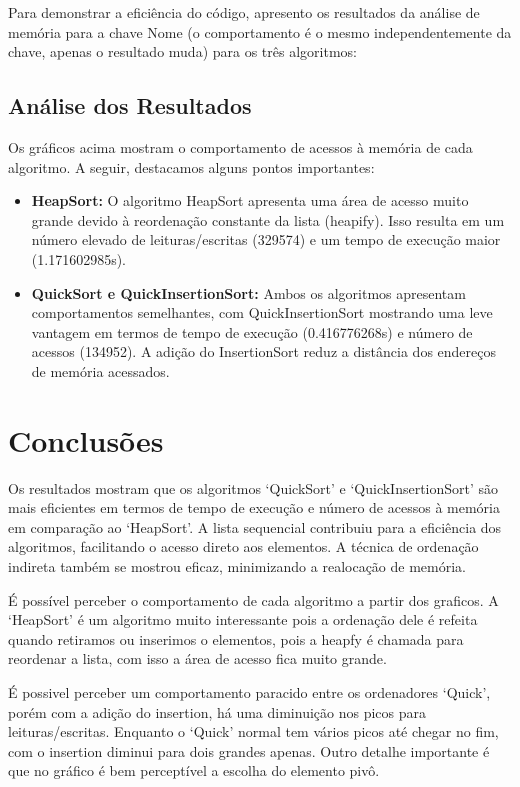 \documentclass[a4paper,12pt]{article}
\begin{document}
Para demonstrar a eficiência do código, apresento os resultados da análise de memória para a chave Nome (o comportamento é o mesmo independentemente da chave, apenas o resultado muda) para os três algoritmos:

\subsection{Análise dos Resultados}
\hspace*{1cm}

Os gráficos acima mostram o comportamento de acessos à memória de cada algoritmo. A seguir, destacamos alguns pontos importantes:

\begin{itemize}
    \item \textbf{HeapSort:} O algoritmo HeapSort apresenta uma área de acesso muito grande devido à reordenação constante da lista (heapify). Isso resulta em um número elevado de leituras/escritas (329574) e um tempo de execução maior (1.171602985s).
    \item \textbf{QuickSort e QuickInsertionSort:} Ambos os algoritmos apresentam comportamentos semelhantes, com QuickInsertionSort mostrando uma leve vantagem em termos de tempo de execução (0.416776268s) e número de acessos (134952). A adição do InsertionSort reduz a distância dos endereços de memória acessados.
\end{itemize}

\section{Conclusões}
\hspace*{1cm}

Os resultados mostram que os algoritmos `QuickSort' e `QuickInsertionSort' são mais eficientes em termos de tempo de execução e número de acessos à memória em comparação ao `HeapSort'.
A lista sequencial contribuiu para a eficiência dos algoritmos, facilitando o acesso direto aos elementos. A técnica de ordenação indireta também se mostrou eficaz, minimizando a realocação de memória. 

É possível perceber o comportamento de cada algoritmo a partir dos graficos.
A `HeapSort' é um algoritmo muito interessante pois a ordenação dele é refeita quando retiramos ou inserimos o elementos,
pois a heapfy é chamada para reordenar a lista, com isso a área de acesso fica muito grande.

É possivel perceber um comportamento paracido entre os ordenadores `Quick', porém com a adição do insertion, há uma diminuição nos picos para leituras/escritas.
Enquanto o `Quick' normal tem vários picos até chegar no fim, com o insertion diminui para dois grandes apenas. 
Outro detalhe importante é que no gráfico é bem perceptível a escolha do elemento pivô.
\end{document}
